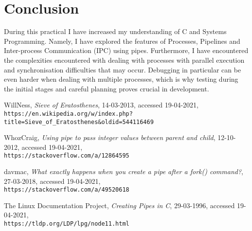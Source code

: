 \documentclass{article}
\begin{document}
    \section{Conclusion}
    During this practical I have increased my understanding of C and Systems Programming.
    Namely, I have explored the features of Processes, Pipelines and Inter-process Communication (IPC) using pipes.
    Furthermore, I have encountered the complexities encountered with dealing with processes with parallel execution and synchronisation difficulties that may occur.
    Debugging in particular can be even harder when dealing with multiple processes, which is why testing during the initial stages and careful planning proves crucial in development.
    
    \begin{thebibliography}{10}
        WillNess, \textit{Sieve of Eratosthenes}, 14-03-2013, accessed 19-04-2021, \\\texttt{https://en.wikipedia.org/w/index.php?title=Sieve\_of\_Eratosthenes\&oldid=544116469}

        WhozCraig, \textit{Using pipe to pass integer values between parent and child}, 12-10-2012, accessed 19-04-2021, \\\texttt{https://stackoverflow.com/a/12864595}

        davmac, \textit{What exactly happens when you create a pipe after a fork() command?}, 27-03-2018, accessed 19-04-2021, \\\texttt{https://stackoverflow.com/a/49520618}

        The Linux Documentation Project, \textit{Creating Pipes in C}, 29-03-1996, accessed 19-04-2021, \\\texttt{https://tldp.org/LDP/lpg/node11.html}

    \end{thebibliography}
\end{document}
